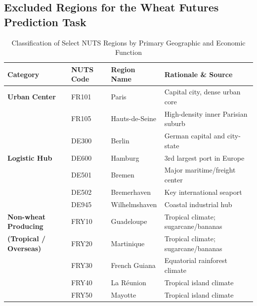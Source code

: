 \documentclass[pdflatex,sn-mathphys-num, oneside, 11pt]{sn-jnl}%
\theoremstyle{thmstyleone}%
\theoremstyle{thmstyletwo}%
\theoremstyle{thmstylethree}%
\begin{document}
\begin{appendices}

\section{Excluded Regions for the Wheat Futures Prediction Task}\label{A1}


\begin{table}[htbp]
\centering
\caption{Classification of Select NUTS Regions by Primary Geographic and Economic Function}
\label{tab:region_classification}
\begin{tabular}{llll}
\toprule
\textbf{Category} & \textbf{NUTS Code} & \textbf{Region Name} & \textbf{Rationale \& Source} \\
\midrule
\textbf{Urban Center} 
& FR101 & Paris & Capital city, dense urban core \cite{insee_stats} \\
& FR105 & Hauts-de-Seine & High-density inner Parisian suburb \cite{insee_stats} \\
& DE300 & Berlin & German capital and city-state \cite{destatis_stats} \\
\midrule
\textbf{Logistic Hub} 
& DE600 & Hamburg & 3rd largest port in Europe \cite{hamburg_port} \\
& DE501 & Bremen & Major maritime/freight center \cite{destatis_stats} \\
& DE502 & Bremerhaven & Key international seaport \cite{bremenports_stats} \\
& DE945 & Wilhelmshaven & Coastal industrial hub \cite{jadeweserport_stats} \\
\midrule
\textbf{Non-wheat Producing} 
& FRY10 & Guadeloupe & Tropical climate; sugarcane/bananas \cite{agreste_stats} \\
\textbf{(Tropical / Overseas)} 
& FRY20 & Martinique & Tropical climate; sugarcane/bananas \cite{agreste_stats} \\
& FRY30 & French Guiana & Equatorial rainforest climate \cite{agreste_stats} \\
& FRY40 & La Réunion & Tropical island climate \cite{agreste_stats} \\
& FRY50 & Mayotte & Tropical island climate \cite{agreste_stats} \\
\bottomrule
\end{tabular}
\end{table}


\end{appendices}
\end{document}
